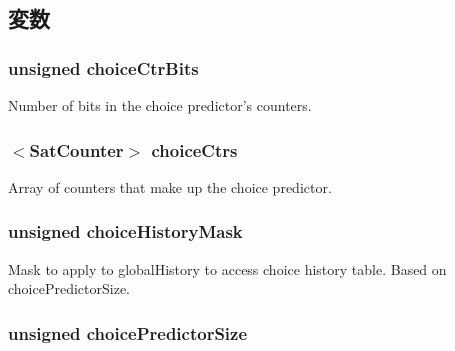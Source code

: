 \subsection{変数}
\hypertarget{classTournamentBP_aee44accc1717e338f8b33ff113d62be2}{
\subsubsection[{choiceCtrBits}]{\setlength{\rightskip}{0pt plus 5cm}unsigned {\bf choiceCtrBits}}}
\label{classTournamentBP_aee44accc1717e338f8b33ff113d62be2}
Number of bits in the choice predictor's counters. \hypertarget{classTournamentBP_a26f80c7389224a73876e470b543e327a}{
\subsubsection[{choiceCtrs}]{$<${\bf SatCounter}$>$ {\bf choiceCtrs}}}
\label{classTournamentBP_a26f80c7389224a73876e470b543e327a}
Array of counters that make up the choice predictor. \hypertarget{classTournamentBP_aaaf50cc17f3cbe92a7d57a4f86c0cf5c}{
\subsubsection[{choiceHistoryMask}]{\setlength{\rightskip}{0pt plus 5cm}unsigned {\bf choiceHistoryMask}}}
\label{classTournamentBP_aaaf50cc17f3cbe92a7d57a4f86c0cf5c}
Mask to apply to globalHistory to access choice history table. Based on choicePredictorSize. \hypertarget{classTournamentBP_aa71f36048f2ff08f22872c928bb15ad7}{
\subsubsection[{choicePredictorSize}]{\setlength{\rightskip}{0pt plus 5cm}unsigned {\bf choicePredictorSize}}}
